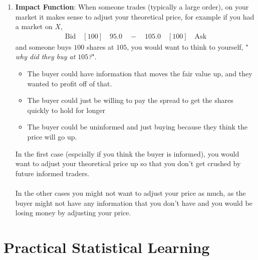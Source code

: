 \documentclass[letterpaper, 11pt]{article}
\newcommand{\1}{\mathds{1}}	%
\theoremstyle{definition}
\begin{document}
\begin{enumerate}
\begin{itemize}
    \end{itemize}
    \item \textbf{Impact Function}: When someone trades (typically a large order), on your market 
    it makes sense to adjust your theoretical price, for example if you had a market on $X$,
    \begin{align}
        \text{Bid} \quad  [100] \quad 95.0 \quad - \quad 105.0 \quad [100] \quad \text{Ask} 
    \end{align}
    and someone buys $100$ shares at $105$, you would want to think to yourself, "
    \textit{why did they buy at $105$?}".
    \begin{itemize}
        \item The buyer could have information that moves the fair value up, and they wanted 
        to profit off of that. 
        \item The buyer could just be willing to pay the spread to get the shares quickly to hold for longer
        \item The buyer could be uninformed and just buying because they think the price will go up.
    \end{itemize}
    In the first case (espcially if you think the buyer is informed), you would want to adjust your 
    theoretical price up so that you don't get crushed by future informed traders. \\ \\
    In the other cases you might not want to adjust your price as much, as the buyer might not have
    any information that you don't have and you would be losing money by adjusting your price.
\end{enumerate}

\section{Practical Statistical Learning}
\end{document}
